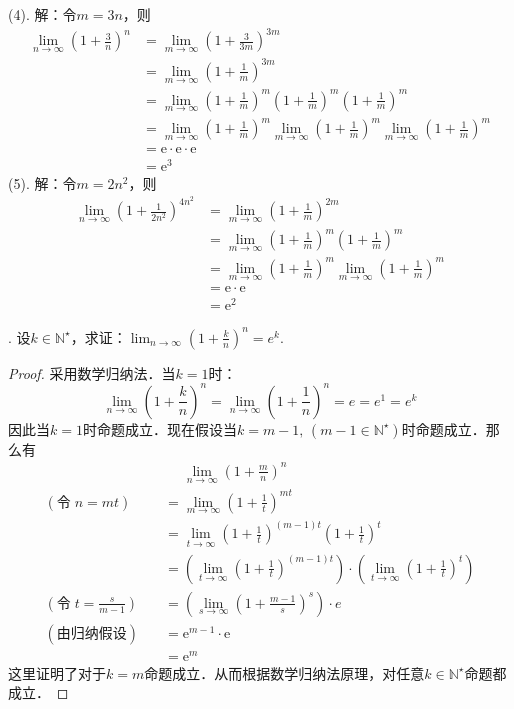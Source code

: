 \documentclass{ctexart}
\theoremstyle{definition}
\theoremstyle{definition}
\theoremstyle{plain}
\theoremstyle{plain}
\theoremstyle{plain}
\theoremstyle{definition}
\begin{document}
(4). 解：令$m=3n$，则
\begin{align}
    \lim_{n\to\infty}\left(1+\frac{3}{n}\right)^n &= \lim_{m\to\infty}\left(1+\frac{3}{3m}\right)^{3m} \\
    &= \lim_{m\to\infty}\left(1+\frac{1}{m}\right)^{3m} \\
    &= \lim_{m\to\infty}\left(1+\frac{1}{m}\right)^{m}\left(1+\frac{1}{m}\right)^{m}\left(1+\frac{1}{m}\right)^{m} \\
    &= \lim_{m\to\infty}\left(1+\frac{1}{m}\right)^{m} \lim_{m\to\infty}\left(1+\frac{1}{m}\right)^{m}\lim_{m\to\infty}\left(1+\frac{1}{m}\right)^{m} \\
    &= \mathrm{e}\cdot\mathrm{e}\cdot\mathrm{e}\\
    &=\mathrm{e}^3
\end{align}
(5). 解：令$m=2n^2$，则
\begin{align}
    \lim_{n\to\infty} \left(1+\frac{1}{2n^2}\right)^{4n^2} &= \lim_{m\to\infty}\left(1+\frac{1}{m}\right)^{2m} \\
    &= \lim_{m\to\infty}\left(1+\frac{1}{m}\right)^{m} \left(1+\frac{1}{m}\right)^{m} \\
    &= \lim_{m\to\infty}\left(1+\frac{1}{m}\right)^{m} \lim_{m\to\infty}\left(1+\frac{1}{m}\right)^{m} \\
    &=\mathrm{e} \cdot \mathrm{e} \\
    &=\mathrm{e}^2
\end{align}

. 设$k \in \mathbb{N}^\star$，求证：$\displaystyle \lim_{n \to \infty} (1+\frac{k}{n})^n = e^k$.
\begin{proof}
采用数学归纳法．当$k=1$时：
\begin{equation}
    \lim_{n\to \infty}(1+\frac{k}{n})^n = \lim_{n \to \infty}(1+\frac{1}{n})^n = e = e^1 = e^k
\end{equation}
因此当$k=1$时命题成立．现在假设当$k = m-1, \, (m-1\in \mathbb{N}^\star)$时命题成立．那么有
\begin{align}
    &\phantom{=} \lim_{n \to \infty} (1+\frac{m}{n})^n \\
    (\text{令} \; n = m t) \quad & = \lim_{m \to \infty} (1 + \frac{1}{t})^{m t} \\
    &= \lim_{t \to \infty} (1+\frac{1}{t})^{(m-1) t} (1+\frac{1}{t})^t \\
    &= \left( \lim_{t \to \infty} (1+\frac{1}{t})^{(m-1) t} \right) \cdot \left( \lim_{t \to \infty} (1+\frac{1}{t})^t \right)\\ 
    (\text{令} \; t = \frac{s}{m-1}) \quad &= \left( \lim_{s \to \infty} (1 + \frac{m-1}{s})^s \right) \cdot e \\
    (\text{由归纳假设} ) \quad &= \mathrm{e}^{m-1} \cdot \mathrm{e} \\
    &= \mathrm{e}^m
\end{align}
这里证明了对于$k = m$命题成立．从而根据数学归纳法原理，对任意$k \in \mathbb{N}^\star$命题都成立．
\end{proof}
\end{document}
